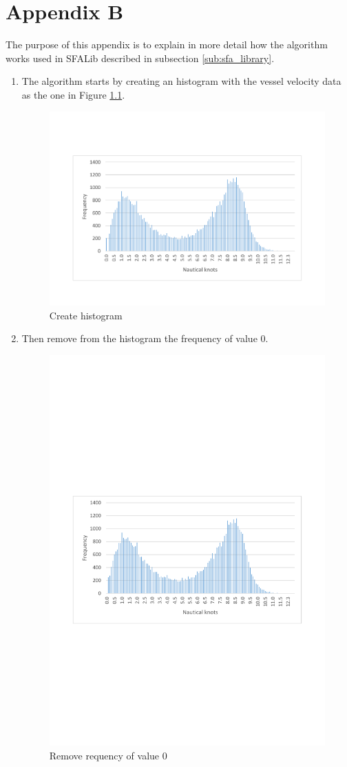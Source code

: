 \chapter{Appendix B} 
\label{appendix:anexo2}

The purpose of this appendix is to explain in more detail how the algorithm works used in SFALib described in subsection \ref{sub:sfa_library}.

\begin{enumerate}


\item The algorithm starts by creating an histogram with the vessel velocity data as the one in Figure \ref{fig:app_b_1}. 

\begin{figure}[H]
    \centering
    \includegraphics[trim=0 80 0 80,height=0.45\linewidth]{Chapters/img/hist_vessel2.pdf}
    \caption{Create histogram}
    \label{fig:app_b_1}
\end{figure}

\newpage
\item Then remove from the histogram the frequency of value 0.
\begin{figure}[H]
    \centering
    \includegraphics[trim=250 275 250 300,height=0.5\linewidth]{Chapters/img/hc_2.pdf}
    \caption{Remove requency of value 0}
    \label{fig:app_b_2}
\end{figure}


\end{enumerate}

